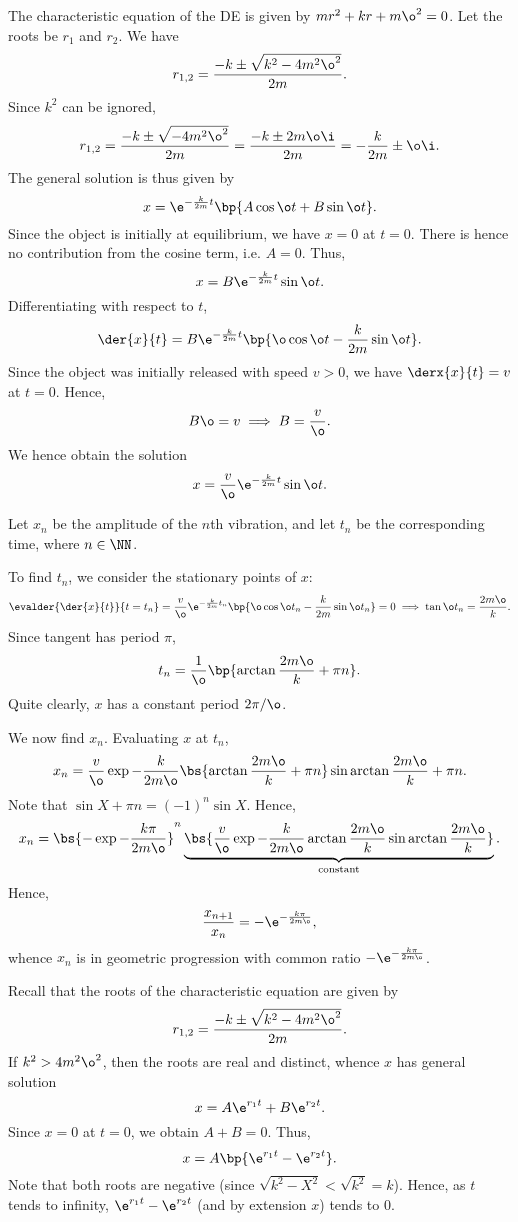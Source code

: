 \begin{solution}
    \begin{ppart}
        The characteristic equation of the DE is given by $m r^2 + kr + m \o^2 = 0$. Let the roots be $r_1$ and $r_2$. We have \[r_{1, 2} = \frac{-k \pm \sqrt{k^2 - 4m^2 \o^2}}{2m}.\] Since $k^2$ can be ignored, \[r_{1, 2} = \frac{-k \pm \sqrt{-4m^2 \o^2}}{2m} = \frac{-k \pm 2m \o \i}{2m} = -\frac{k}{2m} \pm \o \i.\] The general solution is thus given by \[x = \e^{-\frac{k}{2m} t} \bp{A \cos \o t + B \sin \o t}.\] Since the object is initially at equilibrium, we have $x = 0$ at $t = 0$. There is hence no contribution from the cosine term, i.e. $A = 0$. Thus, \[x = B \e^{-\frac{k}{2m} t} \sin \o t.\] Differentiating with respect to $t$, \[\der{x}{t} = B \e^{-\frac{k}{2m} t} \bp{\o \cos \o t - \frac{k}{2m} \sin \o t}.\] Since the object was initially released with speed $v > 0$, we have $\derx{x}{t} = v$ at $t = 0$. Hence, \[B \o = v \implies B = \frac{v}{\o}.\] We hence obtain the solution \[x = \frac{v}{\o} \e^{-\frac{k}{2m} t} \sin \o t.\]
    \end{ppart}
    \begin{ppart}
        Let $x_n$ be the amplitude of the $n$th vibration, and let $t_n$ be the corresponding time, where $n \in \NN$.

        To find $t_n$, we consider the stationary points of $x$: \[\evalder{\der{x}{t}}{t = t_n} = \frac{v}{\o} \e^{-\frac{k}{2m} t_n} \bp{\o \cos \o t_n - \frac{k}{2m} \sin \o t_n} = 0 \implies \tan \o t_n = \frac{2m\o}{k}.\] Since tangent has period $\pi$, \[t_n = \frac{1}{\o} \bp{\arctan \frac{2m\o}{k} + \pi n}.\] Quite clearly, $x$ has a constant period $2\pi / \o$.
        
        We now find $x_n$. Evaluating $x$ at $t_n$, \[x_n = \frac{v}{\o} \exp{-\frac{k}{2m \o} \bs{\arctan \frac{2m\o}{k} + \pi n}} \sin{\arctan \frac{2m\o}{k} + \pi n}.\] Note that $\sin{X + \pi n} = (-1)^n \sin X$. Hence, \[x_n = \bs{-\exp{-\frac{k\pi}{2m \o}}}^n \underbrace{\bs{\frac{v}{\o} \exp{-\frac{k}{2m \o} \arctan \frac{2m\o}{k}} \sin{\arctan \frac{2m\o}{k}}}}_{\text{constant}}.\] Hence, \[\frac{x_{n+1}}{x_n} = -\e^{-\frac{k\pi}{2m \o}},\] whence $x_n$ is in geometric progression with common ratio $-\e^{-\frac{k\pi}{2m \o}}$.
    \end{ppart}
    \begin{ppart}
        Recall that the roots of the characteristic equation are given by \[r_{1, 2} = \frac{-k \pm \sqrt{k^2 - 4m^2 \o^2}}{2m}.\] If $k^2 > 4m^2 \o^2$, then the roots are real and distinct, whence $x$ has general solution \[x = A\e^{r_1 t} + B\e^{r_2 t}.\] Since $x = 0$ at $t = 0$, we obtain $A + B = 0$. Thus, \[x = A\bp{\e^{r_1 t} - \e^{r_2 t}}.\] Note that both roots are negative (since $\sqrt{k^2 - X^2} < \sqrt{k^2} = k$). Hence, as $t$ tends to infinity, $\e^{r_1 t} - \e^{r_2 t}$ (and by extension $x$) tends to 0.


\end{ppart}
\end{solution}
